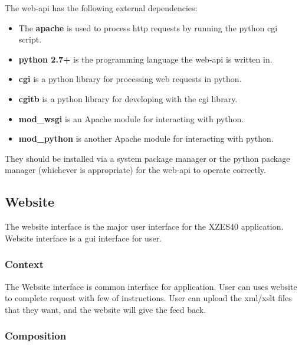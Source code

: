 The \gls{web-api} has the following external dependencies:

\begin{itemize}
	\item The \textbf{\gls{apache}} is used to process \gls{http} requests by running the \gls{python} \gls{cgi} script.
    \item \textbf{\gls{python} 2.7+} is the programming language the \gls{web-api} is written in.
    \item \textbf{cgi} is a \gls{python} library for processing web requests in \gls{python}.
    \item \textbf{cgitb} is a \gls{python} library for developing with the cgi library.
    \item \textbf{mod\_wsgi} is an Apache module for interacting with \gls{python}.
    \item \textbf{mod\_python} is another Apache module for interacting with \gls{python}.
\end{itemize}

They should be installed via a system package manager or the \gls{python} package manager (whichever is appropriate) for the \gls{web-api} to operate correctly.

\subsection{Website}
\label{website}

The website interface is the major user interface for the XZES40 application.
Website interface is a \gls{gui} interface for user.

\subsubsection{Context}

The Website interface is common interface for application.
User can uses website to complete request with few of instructions.
User can upload the \gls{xml}/\gls{xslt} files that they want, and the website will give the feed back.

\subsubsection{Composition}

